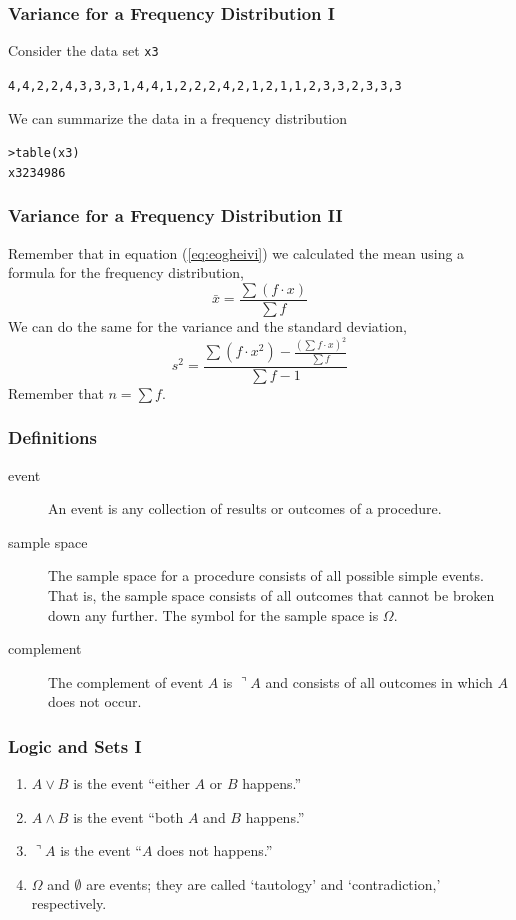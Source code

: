 \documentclass[xcolor=dvipsnames]{beamer}
\begin{document}
\begin{frame}
  \frametitle{Variance for a Frequency Distribution I}
Consider the data set \texttt{x3}
\begin{alltt}
4,4,2,2,4,3,3,3,1,4,4,1,2,2,2,4,2,1,2,1,1,2,3,3,2,3,3,3
\end{alltt}
We can summarize the data in a frequency distribution
\begin{alltt}
> table(x3)\newline
x3 2 3 4  9 8 6 
\end{alltt}
\end{frame}

\begin{frame}
  \frametitle{Variance for a Frequency Distribution II}
Remember that in equation (\ref{eq:eogheivi}) we calculated the mean using a
formula for the frequency distribution,
\begin{equation}
  \label{eq:beingeip}
  \bar{x}=\frac{\sum{}\left(f\cdot{}x\right)}{\sum{}f}
\end{equation}
We can do the same for the variance and the standard deviation,
\begin{equation}
  \label{eq:iefoopoo}
  s^{2}=\frac{\sum{}\left(f\cdot{}x^{2}\right)-\frac{\left(\sum{}f\cdot{}x\right)^{2}}{\sum{}f}}{\sum{}f-1}
\end{equation}
Remember that $n=\sum{}f$.
\end{frame}

\begin{frame}
  \frametitle{Definitions}
  \begin{description}
  \item[event] An event is any collection of results or outcomes of a
    procedure.
  \item[sample space] The sample space for a procedure consists of all
    possible simple events. That is, the sample space consists of all
    outcomes that cannot be broken down any further. The symbol for
    the sample space is $\Omega$. 
  \item[complement] The complement of event $A$ is $\urcorner{}A$ and
    consists of all outcomes in which $A$ does not occur.
  \end{description}
\end{frame}

\begin{frame}
  \frametitle{Logic and Sets I}
  \begin{enumerate}
  \item<1-> $A\vee{}B$ is the event ``either $A$ or $B$ happens.''
  \item<2-> $A\wedge{}B$ is the event ``both $A$ and $B$ happens.''
  \item<3-> $\urcorner{}A$ is the event ``$A$ does not happens.''
  \item<4-> $\Omega$ and $\emptyset$ are events; they are called
    `tautology' and `contradiction,' respectively.
  \end{enumerate}
\end{frame}
\end{document}
